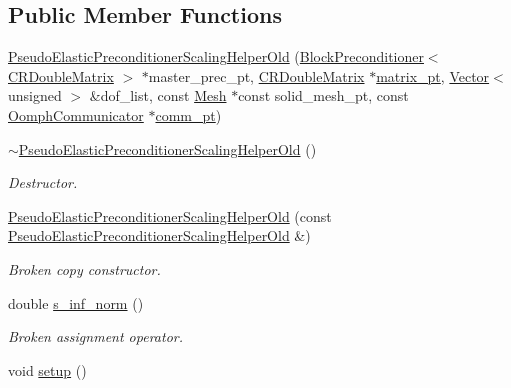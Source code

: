 \subsection*{Public Member Functions}
\begin{DoxyCompactItemize}
\item 
\hyperlink{classoomph_1_1PseudoElasticPreconditionerScalingHelperOld_a90a89541c9067f06446c2a0e9e3c5398}{Pseudo\+Elastic\+Preconditioner\+Scaling\+Helper\+Old} (\hyperlink{classoomph_1_1BlockPreconditioner}{Block\+Preconditioner}$<$ \hyperlink{classoomph_1_1CRDoubleMatrix}{C\+R\+Double\+Matrix} $>$ $\ast$master\+\_\+prec\+\_\+pt, \hyperlink{classoomph_1_1CRDoubleMatrix}{C\+R\+Double\+Matrix} $\ast$\hyperlink{classoomph_1_1BlockPreconditioner_a9aac48fd53e579e6db8eeed58933a14b}{matrix\+\_\+pt}, \hyperlink{classoomph_1_1Vector}{Vector}$<$ unsigned $>$ \&dof\+\_\+list, const \hyperlink{classoomph_1_1Mesh}{Mesh} $\ast$const solid\+\_\+mesh\+\_\+pt, const \hyperlink{classoomph_1_1OomphCommunicator}{Oomph\+Communicator} $\ast$\hyperlink{classoomph_1_1Preconditioner_ada7219933e05d94f39a46a8ddb4c749a}{comm\+\_\+pt})
\item 
\hyperlink{classoomph_1_1PseudoElasticPreconditionerScalingHelperOld_a330a6acc2a56bf439f0b3d603d392cf8}{$\sim$\+Pseudo\+Elastic\+Preconditioner\+Scaling\+Helper\+Old} ()
\begin{DoxyCompactList}\small\item\em Destructor. \end{DoxyCompactList}\item 
\hyperlink{classoomph_1_1PseudoElasticPreconditionerScalingHelperOld_acfd02d4f3aa04aa04485f2cc8678de5f}{Pseudo\+Elastic\+Preconditioner\+Scaling\+Helper\+Old} (const \hyperlink{classoomph_1_1PseudoElasticPreconditionerScalingHelperOld}{Pseudo\+Elastic\+Preconditioner\+Scaling\+Helper\+Old} \&)
\begin{DoxyCompactList}\small\item\em Broken copy constructor. \end{DoxyCompactList}\item 
double \hyperlink{classoomph_1_1PseudoElasticPreconditionerScalingHelperOld_a4774c6db30bd4f7d054e438add48f7eb}{s\+\_\+inf\+\_\+norm} ()
\begin{DoxyCompactList}\small\item\em Broken assignment operator. \end{DoxyCompactList}\item 
void \hyperlink{classoomph_1_1PseudoElasticPreconditionerScalingHelperOld_a42dca15c6f3678880f3b84ccb91513c7}{setup} ()

\end{DoxyCompactItemize}
